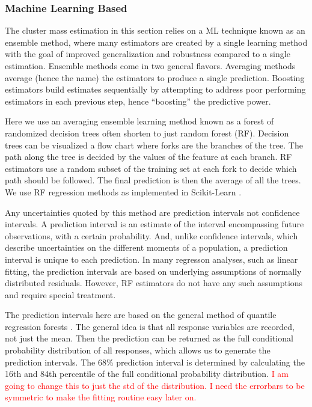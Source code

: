 \documentclass[fleqn,usenatbib]{mnras}
\newcommand{\editorial}[1]{\textcolor{red}{#1}}
\begin{document}
\subsubsection{Machine Learning Based}\label{sec:machine learning method}
The cluster mass estimation in this section relies on a ML technique known as an ensemble method, where many estimators are created by a single learning method with the goal of improved generalization and robustness compared to a single estimation. Ensemble methods come in two general flavors. Averaging methods average (hence the name) the estimators to produce a single prediction. Boosting estimators build estimates sequentially by attempting to address poor performing estimators in each previous step, hence ``boosting'' the predictive power.

Here we use an averaging ensemble learning method known as a forest of randomized decision trees often shorten to just random forest (RF). Decision trees can be visualized a flow chart where forks are the branches of the tree. The path along the tree is decided by the values of the feature at each branch. RF estimators use a random subset of the training set at each fork to decide which path should be followed. The final prediction is then the average of all the trees. We use RF regression methods as implemented in {\sc Scikit-Learn} \citep{Pedregosa2012}.

Any uncertainties quoted by this method are prediction intervals not confidence intervals. A prediction interval is an estimate of the interval encompassing future observations, with a certain probability. And, unlike confidence intervals, which describe uncertainties on the different moments of a population, a prediction interval is unique to each prediction. In many regresson analyses, such as linear fitting, the prediction intervals are based on underlying assumptions of normally distributed residuals. However, RF estimators do not have any such assumptions and require special treatment.

The prediction intervals here are based on the general method of quantile regression forests \citep{Meinshausen2006}. The general idea is that all response variables are recorded, not just the mean. Then the prediction can be returned as the full conditional probability distribution of all responses, which allows us to generate the prediction intervals. The 68\% prediction interval is determined by calculating the 16th and 84th percentile of the full conditional probability distribution. \editorial{I am going to change this to just the std of the distribution. I need the errorbars to be symmetric to make the fitting routine easy later on.}
\end{document}
